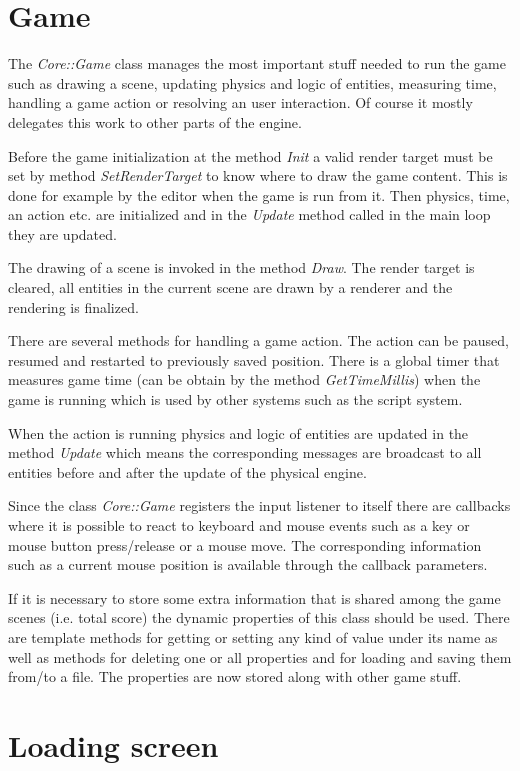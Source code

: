 \documentclass[a4paper, 12pt]{report}
\begin{document}
\section{Game}

The \emph{Core::Game} class manages the most important stuff needed to run the game such as drawing a scene, updating physics and logic of entities, measuring time, handling a game action or resolving an user interaction. Of course it mostly delegates this work to other parts of the engine.

Before the game initialization at the method \emph{Init} a valid render target must be set by method \emph{SetRenderTarget} to know where to draw the game content. This is done for example by the editor when the game is run from it. Then physics, time, an action etc. are initialized and in the \emph{Update} method called in the main loop they are updated.

The drawing of a scene is invoked in the method \emph{Draw}. The render target is cleared, all entities in the current scene are drawn by a renderer and the rendering is finalized.

There are several methods for handling a game action. The action can be paused, resumed and restarted to previously saved position. There is a global timer that measures game time (can be obtain by the method \emph{GetTimeMillis}) when the game is running which is used by other systems such as the script system.

When the action is running physics and logic of entities are updated in the method \emph{Update} which means the corresponding messages are broadcast to all entities before and after the update of the physical engine.

Since the class \emph{Core::Game} registers the input listener to itself there are callbacks where it is possible to react to keyboard and mouse events such as a key or mouse button press/release or a mouse move. The corresponding information such as a current mouse position is available through the callback parameters.

If it is necessary to store some extra information that is shared among the game scenes (i.e. total score) the dynamic properties of this class should be used. There are template methods for getting or setting any kind of value under its name as well as methods for deleting one or all properties and for loading and saving them from/to a file. The properties are now stored along with other game stuff.

\section{Loading screen}
\end{document}
